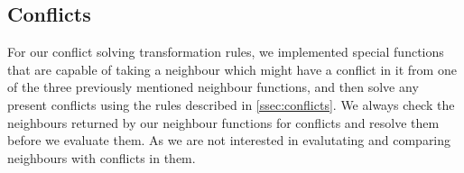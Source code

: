 \subsection{Conflicts}
For our conflict solving transformation rules, we implemented special functions that are capable of taking a neighbour which might have a conflict in it from one of the three previously mentioned neighbour functions, and then solve any present conflicts using the rules described in \cref{ssec:conflicts}. We always check the neighbours returned by our neighbour functions for conflicts and resolve them before we evaluate them. As we are not interested in evalutating and comparing neighbours with conflicts in them.
